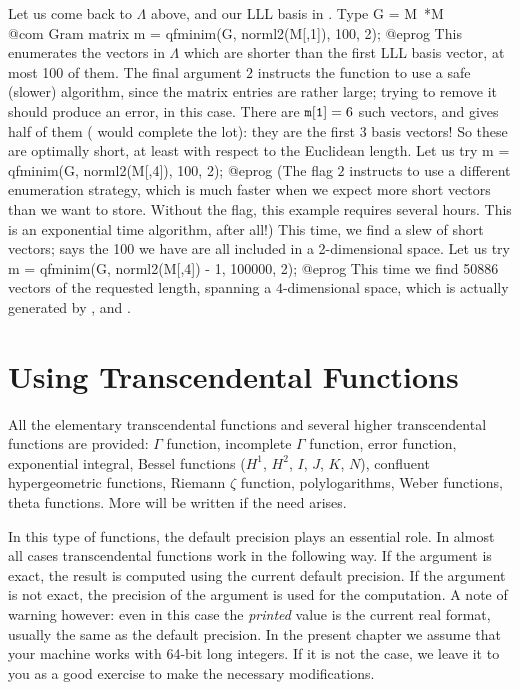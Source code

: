 Let us come back to $\Lambda$ above, and our LLL basis in . Type
\bprog
  G = M~*M  \\@com Gram matrix
  m = qfminim(G, norml2(M[,1]), 100, 2);
@eprog\noindent
This enumerates the vectors in $\Lambda$ which are shorter than the first LLL
basis vector, at most 100 of them. The final argument $2$ instructs the
function to use a safe (slower) algorithm, since the matrix entries are
rather large; trying to remove it should produce an error, in this case.
There are ${\tt m[1]} = 6$ such vectors, and  gives half of them
( would complete the lot): they are the first 3 basis vectors! So
these are optimally short, at least with respect to the Euclidean length. Let
us try
\bprog
  m = qfminim(G, norml2(M[,4]), 100, 2);
@eprog\noindent
(The flag $2$ instructs  to use a different enumeration
strategy, which is much faster when we expect more short vectors than we want
to store. Without the flag, this example requires several hours. This is an
exponential time algorithm, after all!) This time, we find a slew of short
vectors;  says the 100 we have are all included in a
2-dimensional space. Let us try
\bprog
  m = qfminim(G, norml2(M[,4]) - 1, 100000, 2);
@eprog\noindent
This time we find 50886 vectors of the requested length, spanning a
$4$-dimensional space, which is actually generated by ,
  and .

\section{Using Transcendental Functions}

All the elementary transcendental functions and several higher transcendental
functions are provided: $\Gamma$ function, incomplete $\Gamma$ function, error
function, exponential integral, Bessel functions ($H^1$, $H^2$, $I$, $J$,
$K$, $N$), confluent hypergeometric functions, Riemann $\zeta$ function,
polylogarithms, Weber functions, theta functions. More will be written if the
need arises.

In this type of functions, the default precision plays an essential role.
In almost all cases transcendental functions work in the following way.
If the argument is exact, the result is computed using the current
default precision. If the argument is not exact, the precision of the
argument is used for the computation. A note of warning however: even in this
case the \emph{printed} value is the current real format, usually the
same as the default precision. In the present chapter we assume that your
machine works with 64-bit long integers. If it is not the case, we leave it
to you as a good exercise to make the necessary modifications.

